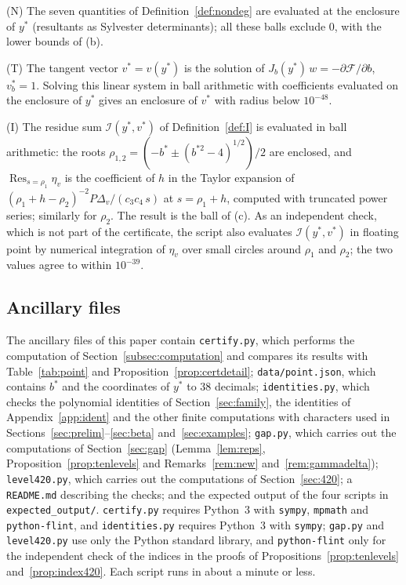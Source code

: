 \documentclass[11pt]{amsart}
\theoremstyle{definition}
\theoremstyle{remark}
\numberwithin{equation}{section}
\newcommand{\cI}{\mathcal{I}}
\newcommand{\Res}{\mathop{\mathrm{Res}}\nolimits}
\begin{document}
(N) The seven quantities of Definition~\ref{def:nondeg} are evaluated at the enclosure of $y^*$ (resultants as Sylvester determinants); all these balls exclude $0$, with the lower bounds of (b).

(T) The tangent vector $v^*=v(y^*)$ is the solution of $J_b(y^*)\,w=-\partial\mathcal F/\partial b$, $v^*_b=1$. Solving this linear system in ball arithmetic with coefficients evaluated on the enclosure of $y^*$ gives an enclosure of $v^*$ with radius below $10^{-48}$.

(I) The residue sum $\cI(y^*,v^*)$ of Definition~\ref{def:I} is evaluated in ball arithmetic: the roots $\rho_{1,2}=(-b^*\pm(b^{*2}-4)^{1/2})/2$ are enclosed, and $\Res_{s=\rho_1}\eta_v$ is the coefficient of $h$ in the Taylor expansion of $(\rho_1+h-\rho_2)^{-2}P\Delta_v/(c_3c_4\,s)$ at $s=\rho_1+h$, computed with truncated power series; similarly for $\rho_2$. The result is the ball of (c). As an independent check, which is not part of the certificate, the script also evaluates $\cI(y^*,v^*)$ in floating point by numerical integration of $\eta_v$ over small circles around $\rho_1$ and $\rho_2$; the two values agree to within $10^{-39}$.

\subsection{Ancillary files}
The ancillary files of this paper contain \texttt{certify.py}, which performs the computation of Section~\ref{subsec:computation} and compares its results with Table~\ref{tab:point} and Proposition~\ref{prop:certdetail}; \texttt{data/point.json}, which contains $b^*$ and the coordinates of $y^*$ to $38$ decimals; \texttt{identities.py}, which checks the polynomial identities of Section~\ref{sec:family}, the identities of Appendix~\ref{app:ident} and the other finite computations with characters used in Sections~\ref{sec:prelim}--\ref{sec:beta} and~\ref{sec:examples}; \texttt{gap.py}, which carries out the computations of Section~\ref{sec:gap} (Lemma~\ref{lem:reps}, Proposition~\ref{prop:tenlevels} and Remarks~\ref{rem:new} and~\ref{rem:gammadelta}); \texttt{level420.py}, which carries out the computations of Section~\ref{sec:420}; a \texttt{README.md} describing the checks; and the expected output of the four scripts in \texttt{expected\_output/}. \texttt{certify.py} requires Python~3 with \texttt{sympy}, \texttt{mpmath} and \texttt{python-flint}, and \texttt{identities.py} requires Python~3 with \texttt{sympy}; \texttt{gap.py} and \texttt{level420.py} use only the Python standard library, and \texttt{python-flint} only for the independent check of the indices in the proofs of Propositions~\ref{prop:tenlevels} and~\ref{prop:index420}. Each script runs in about a minute or less.
\end{document}

